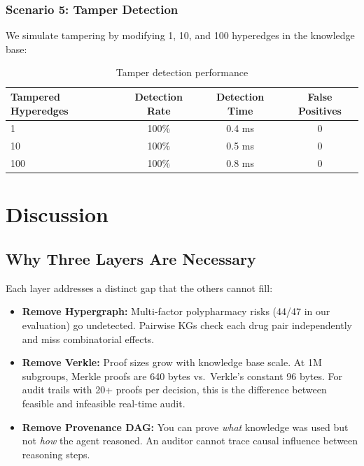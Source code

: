 \documentclass[11pt,a4paper]{article}
\begin{document}
\subsubsection{Scenario 5: Tamper Detection}

We simulate tampering by modifying 1, 10, and 100 hyperedges in the knowledge base:

\begin{table}[H]
\centering
\caption{Tamper detection performance}
\label{tab:tamper}
\begin{tabular}{@{}lccc@{}}
\toprule
\textbf{Tampered Hyperedges} & \textbf{Detection Rate} & \textbf{Detection Time} & \textbf{False Positives} \\ \midrule
1 & 100\% & 0.4 ms & 0 \\
10 & 100\% & 0.5 ms & 0 \\
100 & 100\% & 0.8 ms & 0 \\ \bottomrule
\end{tabular}
\end{table}

\section{Discussion}
\label{sec:discussion}

\subsection{Why Three Layers Are Necessary}

Each layer addresses a distinct gap that the others cannot fill:

\begin{itemize}[noitemsep]
    \item \textbf{Remove Hypergraph:} Multi-factor polypharmacy risks (44/47 in our evaluation) go undetected. Pairwise KGs check each drug pair independently and miss combinatorial effects.
    \item \textbf{Remove Verkle:} Proof sizes grow with knowledge base scale. At 1M subgroups, Merkle proofs are 640 bytes vs.\ Verkle's constant 96 bytes. For audit trails with 20+ proofs per decision, this is the difference between feasible and infeasible real-time audit.
    \item \textbf{Remove Provenance DAG:} You can prove \textit{what} knowledge was used but not \textit{how} the agent reasoned. An auditor cannot trace causal influence between reasoning steps.
\end{itemize}
\end{document}
